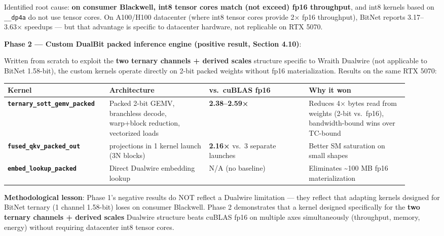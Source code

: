 Identified root cause: \textbf{on consumer Blackwell, int8 tensor cores
match (not exceed) fp16 throughput}, and int8 kernels based on
\texttt{\_\_dp4a} do not use tensor cores. On A100/H100 datacenter
(where int8 tensor cores provide 2× fp16 throughput), BitNet reports
3.17--3.63× speedups --- but that advantage is specific to datacenter
hardware, not replicable on RTX 5070.

\textbf{Phase 2 --- Custom DualBit packed inference engine (positive
result, Section 4.10)}:

Written from scratch to exploit the \textbf{two ternary channels +
derived scales} structure specific to Wraith Dualwire (not applicable to
BitNet 1.58-bit), the custom kernels operate directly on 2-bit packed
weights without fp16 materialization. Results on the same RTX 5070:

{\def\LTcaptype{none} %
{\footnotesize\setlength{\tabcolsep}{3pt}
\begin{longtable}[]{@{}>{\raggedright\arraybackslash}p{0.230\linewidth}>{\raggedright\arraybackslash}p{0.230\linewidth}>{\raggedright\arraybackslash}p{0.230\linewidth}>{\raggedright\arraybackslash}p{0.230\linewidth}@{}}
\toprule\noalign{}
Kernel & Architecture & vs.~cuBLAS fp16 & Why it won \\
\midrule\noalign{}
\endhead
\bottomrule\noalign{}
\endlastfoot
\textbf{\texttt{ternary\_sott\_gemv\_packed}} & Packed 2-bit GEMV,
branchless decode, warp+block reduction, vectorized loads &
\textbf{2.38--2.59×} & Reduces 4× bytes read from weights (2-bit
vs.~fp16), bandwidth-bound wins over TC-bound \\
\textbf{\texttt{fused\_qkv\_packed\_out}} & 3 projections in 1 kernel
launch (3N blocks) & \textbf{2.16×} vs.~3 separate launches & Better SM
saturation on small shapes \\
\textbf{\texttt{embed\_lookup\_packed}} & Direct Dualwire embedding
lookup & N/A (no baseline) & Eliminates \textasciitilde100 MB fp16
materialization \\
\end{longtable}
}
}

\textbf{Methodological lesson}: Phase 1's negative results do NOT
reflect a Dualwire limitation --- they reflect that adapting kernels
designed for BitNet ternary (1 channel 1.58-bit) loses on consumer
Blackwell. Phase 2 demonstrates that a kernel designed specifically for
the \textbf{two ternary channels + derived scales} Dualwire structure
beats cuBLAS fp16 on multiple axes simultaneously (throughput, memory,
energy) without requiring datacenter int8 tensor cores.

